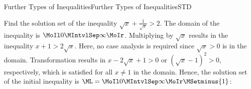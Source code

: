 \begin{MXContent}{Further Types of Inequalities}{Further Types of Inequalities}{STD}
\begin{MExample}
Find the solution set of the inequality $\sqrt{x}+\frac1{\sqrt{x}}>2$. 
The domain of the inequality is $\MoIl 0\MIntvlSep \infty\MoIr$.
Multiplying by $\sqrt{x}$ results in the inequality $x+1>2\sqrt x$. 
Here, no case analysis is required since $\sqrt{x}>0$ is in the domain.
Transformation results in $x-2\sqrt{x}+1>0$ or $(\sqrt{x}-1)^2>0$, respectively, 
which is satisfied for all $x\not=1$ in the domain.
Hence, the solution set of the initial inequality is
$\ML=\MoIl 0\MIntvlSep \infty\MoIr\MSetminus\lbrace 1\rbrace$:
\ \\ \ \\
\begin{center}
\end{center}

\end{MExample}

\end{MXContent}



